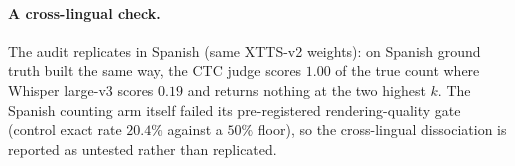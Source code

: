 \paragraph{A cross-lingual check.}\label{sec:spanish}
The audit replicates in Spanish (same XTTS-v2 weights): on Spanish ground
truth built the same way, the CTC judge scores $1.00$ of the true count
where Whisper large-v3 scores $0.19$ and returns nothing at the two
highest $k$. The Spanish counting arm itself failed its pre-registered
rendering-quality gate (control exact rate $20.4\%$ against a $50\%$
floor), so the cross-lingual dissociation is reported as untested rather
than replicated.
